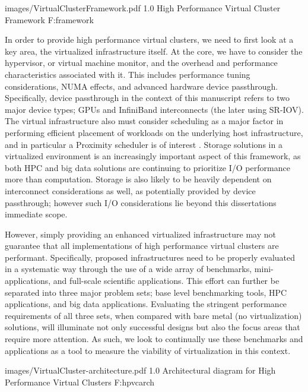   {images/VirtualClusterFramework.pdf}
  {1.0}
  {High Performance Virtual Cluster Framework}
  {F:framework}

In order to provide high performance virtual clusters, we need to first look at a key area, the virtualized infrastructure itself. At the core, we have to consider the hypervisor, or virtual machine monitor, and the overhead and performance characteristics associated with it. This includes performance tuning considerations, NUMA effects, and advanced hardware device passthrough. Specifically, device passthrough in the context of this manuscript refers to two major device types; GPUs and InfiniBand interconnects (the later using SR-IOV). The virtual infrastructure also must consider scheduling as a major factor in performing efficient placement of workloads on the underlying host infrastructure, and in particular a Proximity scheduler is of interest \cite{www-proximity-scheduler}. Storage solutions in a virtualized environment is an increasingly important aspect of this framework, as both HPC and big data solutions are continuing to prioritize I/O performance more than computation. Storage is also likely to be heavily dependent on interconnect considerations as well, as potentially provided by device passthrough; however such I/O considerations lie beyond this dissertations immediate scope.  

However, simply providing an enhanced virtualized infrastructure may not guarantee that all implementations of high performance virtual clusters are performant. Specifically, proposed infrastructures need to be properly evaluated in a systematic way through the use of a wide array of benchmarks, mini-applications, and full-scale scientific applications. This effort can further be separated into three major problem sets; base level benchmarking tools, HPC applications, and big data applications. Evaluating the stringent performance requirements of all three sets, when compared with bare metal (no virtualization) solutions, will illuminate not only successful designs but also the focus areas that require more attention.  As such, we look to continually use these benchmarks and applications as a tool to measure the viability of virtualization in this context. 

  {images/VirtualCluster-architecture.pdf}
  {1.0}
  {Architectural diagram for High Performance Virtual Clusters}
  {F:hpvcarch}

